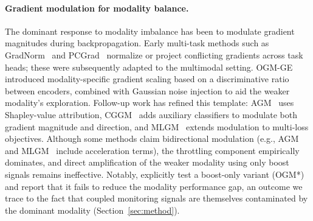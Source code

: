 \documentclass{article}
\begin{document}
\paragraph{Gradient modulation for modality balance.}

The dominant response to modality imbalance has been to modulate gradient magnitudes during backpropagation. Early multi-task methods such as GradNorm~\citep{chen2018gradnorm} and PCGrad~\citep{yu2020pcgrad} normalize or project conflicting gradients across task heads; these were subsequently adapted to the multimodal setting. OGM-GE~\citep{peng2022ogmge} introduced modality-specific gradient scaling based on a discriminative ratio between encoders, combined with Gaussian noise injection to aid the weaker modality's exploration. Follow-up work has refined this template: AGM~\citep{li2023agm} uses Shapley-value attribution, CGGM~\citep{guo2024cggm} adds auxiliary classifiers to modulate both gradient magnitude and direction, and MLGM~\citep{kontras2024mlgm} extends modulation to multi-loss objectives. Although some methods claim bidirectional modulation (e.g., AGM~\citep{li2023agm} and MLGM~\citep{kontras2024mlgm} include acceleration terms), the throttling component empirically dominates, and direct amplification of the weaker modality using only boost signals remains ineffective. Notably, \citet{wei2024opm} explicitly test a boost-only variant (OGM*) and report that it fails to reduce the modality performance gap, an outcome we trace to the fact that coupled monitoring signals are themselves contaminated by the dominant modality (Section~\ref{sec:method}).
\end{document}
